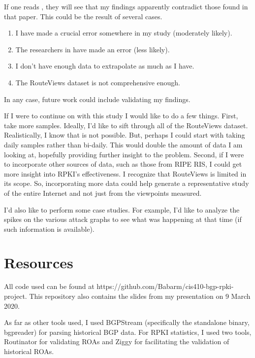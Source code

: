 If one reads \cite{rpki-paper}, they will see that my findings apparently
contradict those found in that paper. This could be the result of several cases.
\begin{enumerate}
    \item I have made a crucial error somewhere in my study (moderately likely).
    \item The researchers in \cite{rpki-paper} have made an error (less likely).
    \item I don't have enough data to extrapolate as much as I have.
    \item The RouteViews dataset is not comprehensive enough.
\end{enumerate}
In any case, future work could include validating my findings.

If I were to continue on with this study I would like to do a few things. First,
take more samples. Ideally, I'd like to sift through all of the RouteViews
dataset. Realistically, I know that is not possible. But, perhaps I could start
with taking daily samples rather than bi-daily. This would double the amount of
data I am looking at, hopefully providing further insight to the problem.
Second, if I were to incorporate other sources of data, such as those from RIPE
RIS, I could get more insight into RPKI's effectiveness. I recognize that
RouteViews is limited in its scope. So, incorporating more data could help
generate a representative study of the entire Internet and not just from the
viewpoints measured.

I'd also like to perform some case studies. For example, I'd like to analyze the
spikes on the various attack graphs to see what was happening at that time (if
such information is available). 

\section{Resources}
All code used can be found at https://github.com/Babarm/cis410-bgp-rpki-project.
This repository also contains the slides from my presentation on 9 March 2020.

As far as other tools used, I used BGPStream \cite{bgpreader} (specifically the
standalone binary, bgpreader) for parsing historical BGP data. For RPKI
statistics, I used two tools, Routinator \cite{routinator} for validating ROAs
and Ziggy \cite{ziggy} for facilitating the validation of historical ROAs.

